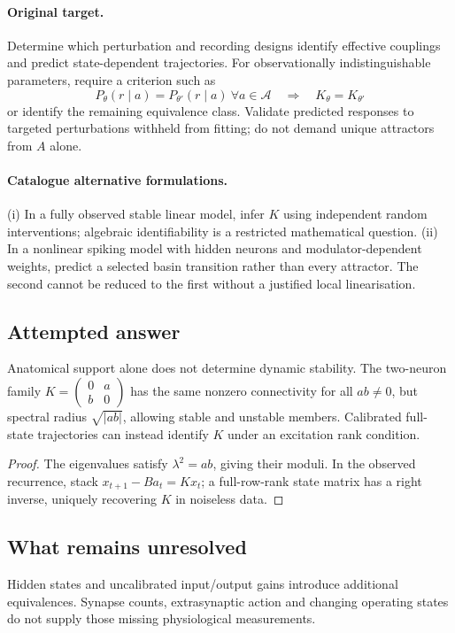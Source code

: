 \documentclass[11pt]{article}
\begin{document}
\paragraph{Original target.}
Determine which perturbation and recording designs identify effective couplings and predict state-dependent trajectories. For observationally indistinguishable parameters, require a criterion such as
\[
P_\theta(r\mid a)=P_{\theta'}(r\mid a)\ \forall a\in\mathcal A
\quad\Longrightarrow\quad
K_\theta=K_{\theta'}
\]
or identify the remaining equivalence class. Validate predicted responses to targeted perturbations withheld from fitting; do not demand unique attractors from $A$ alone.
\paragraph{Catalogue alternative formulations.}
(i) In a fully observed stable linear model, infer $K$ using independent random interventions; algebraic identifiability is a restricted mathematical question. (ii) In a nonlinear spiking model with hidden neurons and modulator-dependent weights, predict a selected basin transition rather than every attractor. The second cannot be reduced to the first without a justified local linearisation.
\subsection{Attempted answer}
\begin{proposition}
Anatomical support alone does not determine dynamic stability. The two-neuron family $K=\left(\begin{smallmatrix}0&a\\b&0\end{smallmatrix}\right)$ has the same nonzero connectivity for all $ab\ne0$, but spectral radius $\sqrt{|ab|}$, allowing stable and unstable members. Calibrated full-state trajectories can instead identify $K$ under an excitation rank condition.
\end{proposition}
\begin{proof}
The eigenvalues satisfy $\lambda^2=ab$, giving their moduli. In the observed recurrence, stack $x_{t+1}-Ba_t=Kx_t$; a full-row-rank state matrix has a right inverse, uniquely recovering $K$ in noiseless data.
\end{proof}
\subsection{What remains unresolved}
Hidden states and uncalibrated input/output gains introduce additional equivalences. Synapse counts, extrasynaptic action and changing operating states do not supply those missing physiological measurements.
\end{document}
